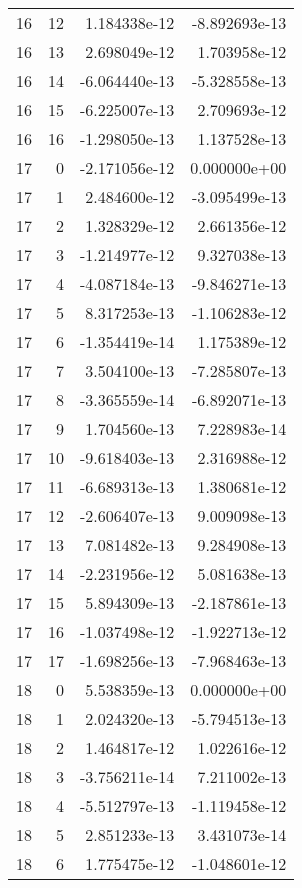 \begin{tabular}{rrrr}
  16 &   12 &  1.184338e-12 & -8.892693e-13 \\
  16 &   13 &  2.698049e-12 &  1.703958e-12 \\
  16 &   14 & -6.064440e-13 & -5.328558e-13 \\
  16 &   15 & -6.225007e-13 &  2.709693e-12 \\
  16 &   16 & -1.298050e-13 &  1.137528e-13 \\
  17 &    0 & -2.171056e-12 &  0.000000e+00 \\
  17 &    1 &  2.484600e-12 & -3.095499e-13 \\
  17 &    2 &  1.328329e-12 &  2.661356e-12 \\
  17 &    3 & -1.214977e-12 &  9.327038e-13 \\
  17 &    4 & -4.087184e-13 & -9.846271e-13 \\
  17 &    5 &  8.317253e-13 & -1.106283e-12 \\
  17 &    6 & -1.354419e-14 &  1.175389e-12 \\
  17 &    7 &  3.504100e-13 & -7.285807e-13 \\
  17 &    8 & -3.365559e-14 & -6.892071e-13 \\
  17 &    9 &  1.704560e-13 &  7.228983e-14 \\
  17 &   10 & -9.618403e-13 &  2.316988e-12 \\
  17 &   11 & -6.689313e-13 &  1.380681e-12 \\
  17 &   12 & -2.606407e-13 &  9.009098e-13 \\
  17 &   13 &  7.081482e-13 &  9.284908e-13 \\
  17 &   14 & -2.231956e-12 &  5.081638e-13 \\
  17 &   15 &  5.894309e-13 & -2.187861e-13 \\
  17 &   16 & -1.037498e-12 & -1.922713e-12 \\
  17 &   17 & -1.698256e-13 & -7.968463e-13 \\
  18 &    0 &  5.538359e-13 &  0.000000e+00 \\
  18 &    1 &  2.024320e-13 & -5.794513e-13 \\
  18 &    2 &  1.464817e-12 &  1.022616e-12 \\
  18 &    3 & -3.756211e-14 &  7.211002e-13 \\
  18 &    4 & -5.512797e-13 & -1.119458e-12 \\
  18 &    5 &  2.851233e-13 &  3.431073e-14 \\
  18 &    6 &  1.775475e-12 & -1.048601e-12 \\

\end{tabular}
